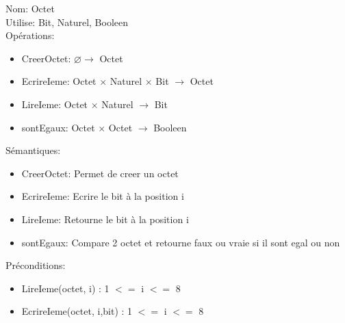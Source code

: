 \documentclass{article}
\begin{document}
    \thispagestyle{empty}
    \noindent
    Nom: Octet \\
    Utilise: Bit, Naturel, Booleen \\
    Opérations: \begin{itemize}[label=$\ $, leftmargin=2cm]
        \item CreerOctet: $\varnothing  \rightarrow $ Octet
        \item EcrireIeme: Octet $ \times $ Naturel $ \times $ Bit $ \rightarrow $ Octet
        \item LireIeme: Octet $ \times $ Naturel $ \rightarrow $ Bit 
        \item sontEgaux: Octet $ \times $ Octet $ \rightarrow $ Booleen 
    \end{itemize}
    Sémantiques: \begin{itemize}[label=$\ $, leftmargin=2cm]
        \item CreerOctet: Permet de creer un octet
        \item EcrireIeme: Ecrire le bit à la position i
        \item LireIeme: Retourne le bit à la position i
        \item sontEgaux: Compare 2 octet et retourne faux ou vraie si il sont egal ou non
    \end{itemize}
    Préconditions: \begin{itemize}[label=$\- $, leftmargin=2cm]
        \item LireIeme(octet, i) : 1 $ <= $ i $ <= $ 8
        \item EcrireIeme(octet, i,bit) : 1 $ <= $ i $ <= $ 8
        
    \end{itemize}
\end{document}
